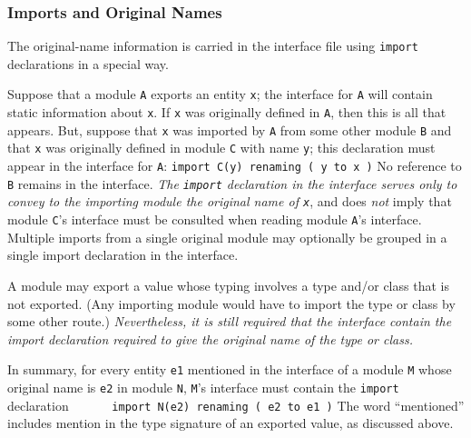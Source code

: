 \subsubsection{Imports and Original Names}
\label{interface-imports}

The original-name information is carried in the interface file using
\mbox{\tt import} declarations in a special way.

Suppose that a module \mbox{\tt A} exports an entity \mbox{\tt x}; the
interface for \mbox{\tt A} will contain static information about \mbox{\tt x}.  
If \mbox{\tt x} was originally defined in \mbox{\tt A}, then this is
all that appears.
But, suppose that \mbox{\tt x} was imported by \mbox{\tt A} from some other module \mbox{\tt B}
and that \mbox{\tt x} was originally defined in module \mbox{\tt C}
with name \mbox{\tt y}; this declaration must appear in the interface for \mbox{\tt A}:
\bprog
\mbox{\tt import\ C(y)\ renaming\ (\ y\ to\ x\ )}
\eprog
No reference to \mbox{\tt B} remains in the interface.  {\em The
\mbox{\tt import} declaration in the interface serves only to convey to the
importing module the original name of \mbox{\tt x}}, and does {\em not} imply
that module \mbox{\tt C}'s interface must be consulted when reading module \mbox{\tt A}'s
interface.  Multiple imports from a single original module may
optionally be grouped in a single import declaration in the interface.

A module may export a value whose typing involves a type and/or class
that is not exported.
(Any importing module would have to import the type or class by some
other route.)
{\em Nevertheless, it is still required that the interface contain the
import declaration required to give the original name of the type or class.}

In summary, for every entity \mbox{\tt e1} mentioned in the interface 
of a module \mbox{\tt M} whose original name is \mbox{\tt e2} in module \mbox{\tt N},
\mbox{\tt M}'s interface must
contain the \mbox{\tt import} declaration
\bprog
\mbox{\tt \ \ \ \ \ \ import\ N(e2)\ renaming\ (\ e2\ to\ e1\ )}
\eprog
The word ``mentioned'' includes mention in the type signature
of an exported value, as discussed above.

